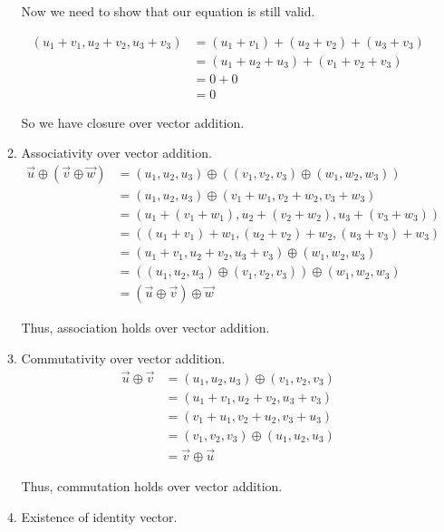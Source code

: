 \documentclass[12pt,letterpaper]{article}
\begin{document}
\begin{enumerate}
\begin{enumerate}
           Now we need to show that our equation is still valid.
           
           \begin{align*}
             (u_1 + v_1, u_2 + v_2, u_3 + v_3) &= (u_1 + v_1) + (u_2 + v_2) + (u_3 + v_3) \\
             &= (u_1 + u_2 + u_3) + (v_1 + v_2 + v_3) \\
             &= 0 + 0 \\
             &= 0
           \end{align*}
           
           So we have closure over vector addition.
           
         \item Associativity over vector addition.
           \begin{align*}
             \vec{u} \oplus (\vec{v} \oplus \vec{w}) &= (u_1, u_2, u_3) \oplus ((v_1, v_2, v_3) \oplus (w_1, w_2, w_3)) \\
             &= (u_1, u_2, u_3) \oplus (v_1 + w_1, v_2 + w_2, v_3 + w_3) \\
             &= (u_1 + (v_1 + w_1), u_2 + (v_2 + w_2), u_3 + (v_3 + w_3)) \\
             &= ((u_1 + v_1) + w_1, (u_2 + v_2) + w_2, (u_3 + v_3) + w_3) \\
             &= (u_1 + v_1, u_2 + v_2, u_3 + v_3) \oplus (w_1, w_2, w_3) \\
             &= ((u_1, u_2, u_3) \oplus (v_1, v_2, v_3)) \oplus (w_1, w_2, w_3) \\
             &= (\vec{u} \oplus \vec{v}) \oplus \vec{w}
           \end{align*}
           
           Thus, association holds over vector addition.
           
         \item Commutativity over vector addition.
           \begin{align*}
             \vec{u} \oplus \vec{v} &= (u_1, u_2, u_3) \oplus (v_1, v_2, v_3) \\
             &= (u_1 + v_1, u_2 + v_2, u_3 + v_3) \\
             &= (v_1 + u_1, v_2 + u_2, v_3 + u_3) \\
             &= (v_1, v_2, v_3) \oplus (u_1, u_2, u_3) \\
             &= \vec{v} \oplus \vec{u}
           \end{align*}
           
           Thus, commutation holds over vector addition.
           
         \item Existence of identity vector.
           
       \end{enumerate}
       
  \end{enumerate}
\end{document}
